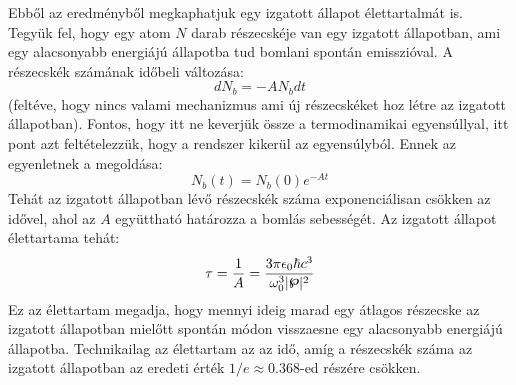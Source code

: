 \documentclass[../main.tex]{subfiles}
\begin{document}
Ebből az eredményből megkaphatjuk egy izgatott állapot élettartalmát is. Tegyük fel, hogy egy atom $N$ darab részecskéje van egy izgatott állapotban, ami egy alacsonyabb energiájú állapotba tud bomlani spontán emisszióval.
A részecskék számának időbeli változása:
\begin{equation}
    dN_b = - A N_b dt
\end{equation}
(feltéve, hogy nincs valami mechanizmus ami új részecskéket hoz létre az izgatott állapotban). Fontos, hogy itt ne keverjük össze a termodinamikai egyensúllyal, itt pont azt feltételezzük, hogy a rendszer kikerül az egyensúlyból.
Ennek az egyenletnek a megoldása:
\begin{equation}
    N_b(t) = N_b(0) e^{-At}
\end{equation}
Tehát az izgatott állapotban lévő részecskék száma exponenciálisan csökken az idővel, ahol az $A$ együttható határozza a bomlás sebességét. Az izgatott állapot élettartama tehát:
\begin{equation}
    \tau = \frac{1}{A} = \frac{3 \pi \epsilon_0 \hbar c^3}{\omega_0^3 |\boldsymbol{\pw}|^2}
\end{equation}
Ez az élettartam megadja, hogy mennyi ideig marad egy átlagos részecske az izgatott állapotban mielőtt spontán módon visszaesne egy alacsonyabb energiájú állapotba. Technikailag az élettartam az az idő, amíg a részecskék száma az izgatott állapotban az eredeti érték $1/e \approx 0.368$-ed részére csökken.
\end{document}
